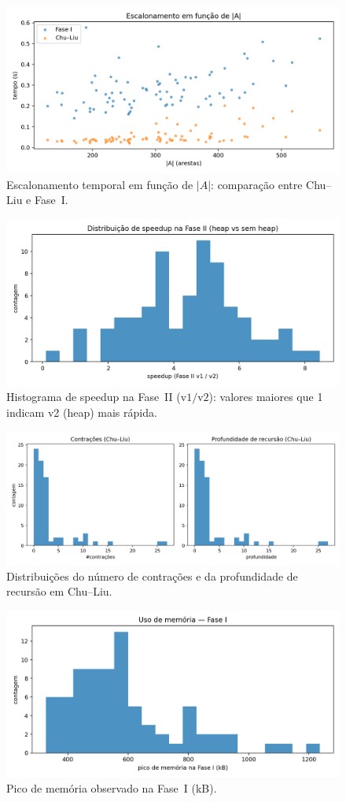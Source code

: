 \documentclass[12pt,a4paper]{article}
\def\emph#1{#1}%
\begin{document}
\begin{figure}[H]
    \centering
    \includegraphics[width=.85\linewidth]{figures/fig_time_vs_edges_scatter.png}
    \caption{Escalonamento temporal em função de \(|A|\): comparação entre \emph{Chu--Liu} e Fase~I.}
    \label{fig:time-vs-edges}
\end{figure}

\begin{figure}[H]
    \centering
    \includegraphics[width=.75\linewidth]{figures/fig_speedup_hist.png}
    \caption{Histograma de speedup na Fase~II (\(\text{v1}/\text{v2}\)): valores maiores que 1 indicam v2 (heap) mais rápida.}
    \label{fig:speedup}
\end{figure}

\begin{figure}[H]
    \centering
    \includegraphics[width=.48\linewidth]{figures/fig_contractions_depth.png}
    \caption{Distribuições do número de contrações e da profundidade de recursão em \emph{Chu--Liu}.}
    \label{fig:contr-depth}
\end{figure}

\begin{figure}[H]
    \centering
    \includegraphics[width=.75\linewidth]{figures/fig_peakmem_hist.png}
    \caption{Pico de memória observado na Fase~I (kB).}
    \label{fig:peakmem}
\end{figure}
\end{document}
